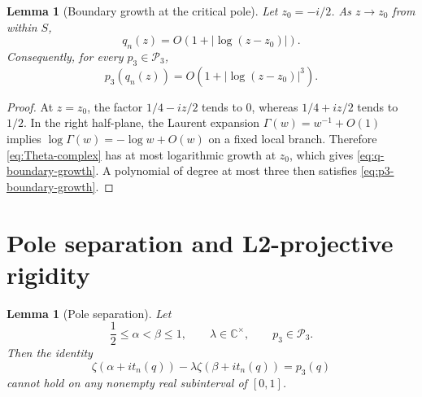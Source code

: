 \documentclass[11pt]{amsart}
\numberwithin{equation}{section}
\newtheorem{lemma}[theorem]{Lemma}
\newcommand{\C}{\mathbb C}
\newcommand{\Pcal}{\mathcal P}
\begin{document}
\begin{lemma}[Boundary growth at the critical pole]
\label{lem:q-boundary-growth}
Let $z_0=-i/2$.  As $z\to z_0$ from within $S$,
\begin{equation}
 q_n(z)=O\!\left(1+|\log(z-z_0)|\right).
 \label{eq:q-boundary-growth}
\end{equation}
Consequently, for every $p_3\in\Pcal_3$,
\begin{equation}
 p_3(q_n(z))
 =O\!\left(1+|\log(z-z_0)|^3\right).
 \label{eq:p3-boundary-growth}
\end{equation}
\end{lemma}

\begin{proof}
At $z=z_0$, the factor
$1/4-iz/2$ tends to $0$, whereas $1/4+iz/2$ tends to $1/2$.
In the right half-plane, the Laurent expansion
$\Gamma(w)=w^{-1}+O(1)$ implies
$\log\Gamma(w)=-\log w+O(w)$ on a fixed local branch.  Therefore
\eqref{eq:Theta-complex} has at most logarithmic growth at $z_0$, which gives
\eqref{eq:q-boundary-growth}.  A polynomial of degree at most three then
satisfies \eqref{eq:p3-boundary-growth}.
\end{proof}

\section{Pole separation and L2-projective rigidity}
\label{sec:pole-rigidity}

\begin{lemma}[Pole separation]
\label{lem:pole-separation}
Let
\begin{equation}
 \frac12\leq\alpha<\beta\leq1,
 \qquad
 \lambda\in\C^\times,
 \qquad
 p_3\in\Pcal_3.
 \label{eq:pole-separation-hypotheses}
\end{equation}
Then the identity
\begin{equation}
 \zeta(\alpha+i t_n(q))
 -\lambda\zeta(\beta+i t_n(q))
 =p_3(q)
 \label{eq:pole-separation-identity}
\end{equation}
cannot hold on any nonempty real subinterval of $[0,1]$.
\end{lemma}
\end{document}
